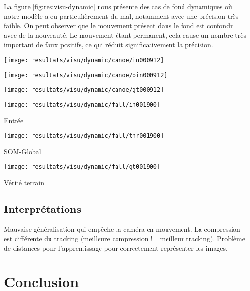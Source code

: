 	La figure \ref{fig:res:visu-dynamic} nous présente des cas de fond dynamiques où notre modèle a eu particulièrement du mal, notamment avec une précision très faible. On peut observer que le mouvement présent dans le fond est confondu avec de la nouveauté. Le mouvement étant permanent, cela cause un nombre très important de faux positifs, ce qui réduit significativement la précision.  

	\begin{figureth}
		\begin{subfigureth}{.32\textwidth}
			\texttt{[image: resultats/visu/dynamic/canoe/in000912]}
		\end{subfigureth}
		\begin{subfigureth}{.32\textwidth}
			\texttt{[image: resultats/visu/dynamic/canoe/bin000912]}
		\end{subfigureth}
		\begin{subfigureth}{.32\textwidth}
			\texttt{[image: resultats/visu/dynamic/canoe/gt000912]}
		\end{subfigureth}

		\begin{subfigureth}{.32\textwidth}
			\texttt{[image: resultats/visu/dynamic/fall/in001900]} \caption{Entrée}
		\end{subfigureth}
		\begin{subfigureth}{.32\textwidth}
			\texttt{[image: resultats/visu/dynamic/fall/thr001900]} \caption{SOM-Global}
		\end{subfigureth}
		\begin{subfigureth}{.32\textwidth}
			\texttt{[image: resultats/visu/dynamic/fall/gt001900]} \caption{Vérité terrain}
		\end{subfigureth}

		\caption[]{}\label{fig:res:visu-dynamic}
	\end{figureth}

	\subsection{Interprétations}

	

	Mauvaise généralisation qui empêche la caméra en mouvement. La compression est différente du tracking (meilleure compression != meilleur tracking). Problème de distances pour l'apprentissage pour correctement représenter les images.

	\section{Conclusion}
		

